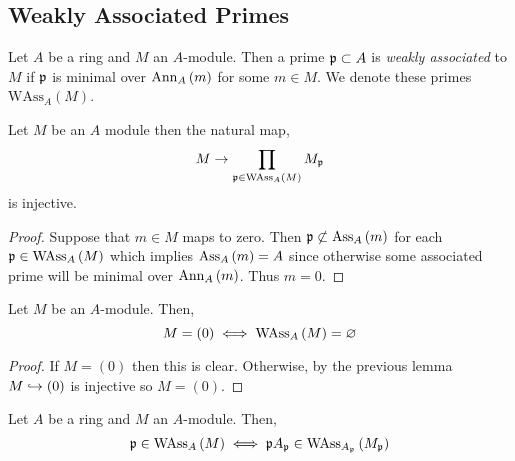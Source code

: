 \documentclass[12pt]{article}
\begin{document}
\newcommand{\WAss}[2]{\mathrm{WAss}_{#1}\left(#2 \right)}

\subsection{Weakly Associated Primes}

\begin{defn}
Let $A$ be a ring and $M$ an $A$-module. Then a prime $\mathfrak{p} \subset A$ is \textit{weakly associated} to $M$ if $\mathfrak{p}$ is minimal over $\mathrm{Ann}_{A}\left(m\right)$ for some $m \in M$. We denote these primes $\WAss{A}{M}$.
\end{defn}

\begin{lemma}
Let $M$ be an $A$ module then the natural map,
\[ M \to \prod_{\p \in \WAss{A}{M}} M_\p \]
is injective.
\end{lemma}

\begin{proof}
Suppose that $m \in M$ maps to zero. Then $\mathfrak{p} \not\subset \mathrm{Ass}_{A}\left( m \right)$ for each $\p \in \WAss{A}{M}$ which implies $\mathrm{Ass}_{A}\left( m \right) = A$ since otherwise some associated prime will be minimal over $\mathrm{Ann}_{A}\left(m\right)$. Thus $m = 0$.
\end{proof}

\begin{lemma}
Let $M$ be an $A$-module. Then,
\[ M = (0) \iff \WAss{A}{M} = \empty \]
\end{lemma}

\begin{proof}
If $M = (0)$ then this is clear. Otherwise, by the previous lemma $M \hookrightarrow (0)$ is injective so $M = (0)$. 
\end{proof}

\begin{lemma} \label{weak_ass_primes_localization}
Let $A$ be a ring and $M$ an $A$-module. Then,
\[ \p \in \WAss{A}{M} \iff \p A_\p \in \WAss{A_\p}{M_\p} \]
\end{lemma}
\end{document}
